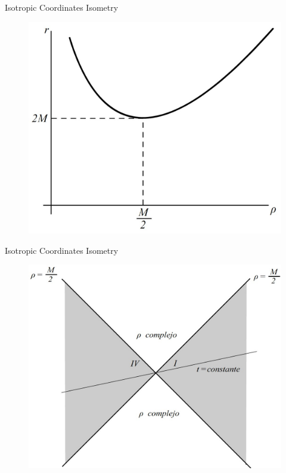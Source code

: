 \documentclass{beamer}
\begin{document}
        \begin{frame}{Isotropic Coordinates Isometry}
        	\begin{center}
				\begin{figure}
				\includegraphics[scale=0.75] {fig8.jpg}
				\end{figure}
			\end{center}	
        \end{frame}
        
        \begin{frame}{Isotropic Coordinates Isometry}
        	\begin{center}
				\begin{figure}
				\includegraphics[scale=0.75] {fig8a.jpg}
				\end{figure}
			\end{center}	
        \end{frame}
        
\end{document}
